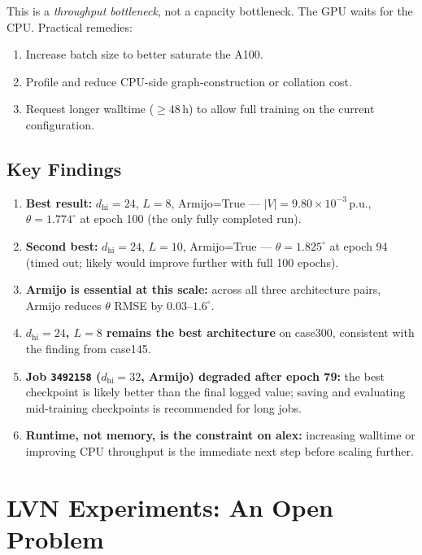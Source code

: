\documentclass{article}
\begin{document}
This is a \emph{throughput bottleneck}, not a capacity bottleneck.
The GPU waits for the CPU.  Practical remedies:
\begin{enumerate}[noitemsep]
  \item Increase batch size to better saturate the A100.
  \item Profile and reduce CPU-side graph-construction or collation cost.
  \item Request longer walltime ($\ge 48$\,h) to allow full training on the
    current configuration.
\end{enumerate}

\subsection{Key Findings}

\begin{enumerate}[noitemsep]
  \item \textbf{Best result:} $d_{\mathrm{hi}}=24$, $L=8$, Armijo=True ---
    $|V|=9.80\times10^{-3}$\,p.u., $\theta=1.774^\circ$ at epoch 100
    (the only fully completed run).
  \item \textbf{Second best:} $d_{\mathrm{hi}}=24$, $L=10$, Armijo=True ---
    $\theta=1.825^\circ$ at epoch 94 (timed out; likely would improve
    further with full 100 epochs).
  \item \textbf{Armijo is essential at this scale:} across all three
    architecture pairs, Armijo reduces $\theta$ RMSE by $0.03$--$1.6^\circ$.
  \item \textbf{$d_{\mathrm{hi}}=24$, $L=8$ remains the best architecture}
    on case300, consistent with the finding from case145.
  \item \textbf{Job \texttt{3492158} ($d_{\mathrm{hi}}=32$, Armijo) degraded
    after epoch 79:} the best checkpoint is likely better than the final
    logged value; saving and evaluating mid-training checkpoints is
    recommended for long jobs.
  \item \textbf{Runtime, not memory, is the constraint on alex:}
    increasing walltime or improving CPU throughput is the immediate next
    step before scaling further.
\end{enumerate}

\section{LVN Experiments: An Open Problem}
\label{sec:lvn}
\end{document}

